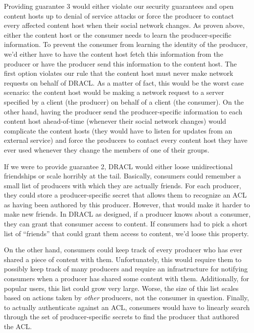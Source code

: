 \documentclass[pdftex,12pt,a4papaer,twoside,notitlepage]{report}
\begin{document}
Providing guarantee 3 would either violate our security guarantees and open
content hosts up to denial of service attacks or force the producer to contact
every affected content host when their social network changes. As proven above,
either the content host or the consumer needs to learn the producer-specific
information. To prevent the consumer from learning the identity of the producer,
we'd either have to have the content host fetch this information from the
producer or have the producer send this information to the content host. The
first option violates our rule that the content host must never make network
requests on behalf of DRACL\@. As a matter of fact, this would be the worst case
scenario: the content host would be making a network request to a server
specified by a client (the producer) on behalf of a client (the consumer). On
the other hand, having the producer send the producer-specific information to
each content host ahead-of-time (whenever their social network changes) would
complicate the content hosts (they would have to listen for updates from an
external service) and force the producers to contact every content host they
have ever used whenever they change the members of one of their groups.

If we were to provide guarantee 2, DRACL would either loose unidirectional
friendships or scale horribly at the tail. Basically, consumers could remember a
small list of producers with which they are actually friends. For each producer,
they could store a producer-specific secret that allows them to recognize an ACL
as having been authored by this producer. However, that would make it harder to
make new friends. In DRACL as designed, if a producer knows about a consumer,
they can grant that consumer access to content. If consumers had to pick a short
list of ``friends'' that could grant them access to content, we'd loose this
property.

On the other hand, consumers could keep track of every producer who has ever
shared a piece of content with them. Unfortunately, this would require them to
possibly keep track of many producers and require an infrastructure for
notifying consumers when a producer has shared some content with them.
Additionally, for popular users, this list could grow very large. Worse, the
size of this list scales based on actions taken by \emph{other} producers, not
the consumer in question. Finally, to actually authenticate against an ACL,
consumers would have to linearly search through the set of producer-specific
secrets to find the producer that authored the ACL\@.
\end{document}
